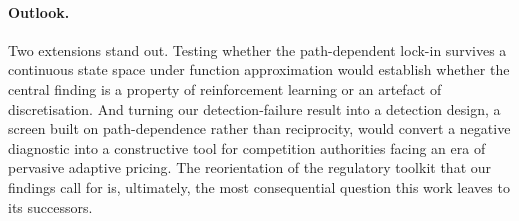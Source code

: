 \paragraph{Outlook.}
Two extensions stand out. Testing whether the path-dependent
lock-in survives a continuous state space under function
approximation would establish whether the central finding is a
property of reinforcement learning or an artefact of
discretisation. And turning our detection-failure result into a
detection design, a screen built on path-dependence rather
than reciprocity, would convert a negative diagnostic into a
constructive tool for competition authorities facing an era of
pervasive adaptive pricing. The reorientation of the regulatory
toolkit that our findings call for is, ultimately, the most
consequential question this work leaves to its successors.



